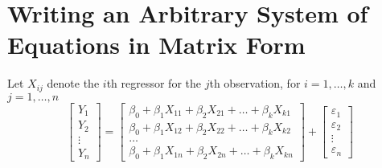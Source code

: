\begin{comment}
For funkier matrices, you can make the brackets manually:


\begin{equation*}
\left\lceil
\begin{matrix}
	1 & 2 & 3\\
	a & b & c
\end{matrix}
\right\rceil
\end{equation*}

\begin{equation*}
\left\langle
\begin{matrix}
	1 & 2 & 3\\
	a & b & c
\end{matrix}
\right\rangle
\end{equation*}

\subsection{Inline Matrices}

Trying to typeset an inline matrix here
$\begin{pmatrix}
	a & b\\ 
	c & d
\end{pmatrix}$ 
but it looks too big, so let's try 
$\big(\begin{smallmatrix}
	a & b\\
	c & d
\end{smallmatrix}\big)$ 
instead.
\end{comment}


\section{Writing an Arbitrary System of Equations in Matrix Form}

Let $X_{ij}$ denote the $i$th regressor for the $j$th observation, for $i=1,\ldots,k$ and $j=1,\ldots,n$
        \begin{equation*}
            \begin{bmatrix}
Y_1 \\ Y_2 \\ \vdots \\ Y_n
\end{bmatrix} =
\begin{bmatrix}
\beta_0 + \beta_1 X_{11} + \beta_2 X_{21} + \ldots + \beta_kX_{k1}\\
\beta_0 + \beta_1 X_{12} + \beta_2 X_{22} + \ldots + \beta_kX_{k2}\\
\ldots\\
\beta_0 + \beta_1 X_{1n} + \beta_2 X_{2n} + \ldots + \beta_kX_{kn}
\end{bmatrix}+
\begin{bmatrix}
\varepsilon_1 \\
\varepsilon_2 \\
\vdots\\
\varepsilon_n
\end{bmatrix}
        \end{equation*}

